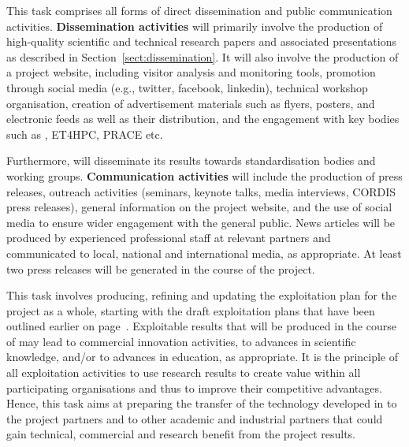 \begin{Workpackage}{\thewpno}
\begin{Task}
This task comprises all forms of direct dissemination and public communication activities.
%
\textbf{Dissemination activities} will primarily involve the production of high-quality scientific and technical research papers and associated presentations as described in Section~\ref{sect:dissemination}.
It will also involve the production of a project website, including visitor analysis and monitoring tools, promotion through social media (e.g., twitter, facebook, linkedin), technical workshop organisation, creation of advertisement materials such as flyers, posters, and electronic feeds as well as their distribution, and the engagement with key bodies such as \hipeac, ET4HPC, PRACE etc.

Furthermore, \TheProject will disseminate its results towards standardisation bodies and working groups.
%
\textbf{Communication activities} will include the production of press releases, outreach activities (seminars, keynote talks, media interviews, CORDIS press releases), general information on the project website, and the use of social media to ensure wider engagement with the general public.
News articles will be produced by experienced professional staff at relevant partners and communicated to local, national and international media, as appropriate.
At least two press releases will be generated in the course of the project.

\end{Task}

\begin{Task}


\TaskHeader{}


This task involves producing, refining and updating the exploitation plan for the project as a whole, starting with the draft exploitation plans that have been outlined earlier on page~\pageref{sect:exploitation-plan}.
Exploitable results that will be produced in the course of \TheProject may lead to commercial innovation activities, to advances in scientific knowledge, and/or to advances in education, as appropriate.
It is the principle of all exploitation activities to use research results to create value within all participating organisations and thus to improve their competitive advantages.
Hence, this task aims at preparing the transfer of the technology developed in \TheProject{} to the project partners and to other academic and industrial partners that could gain technical, commercial and research benefit from the project results.


\end{Task}
\end{Workpackage}
